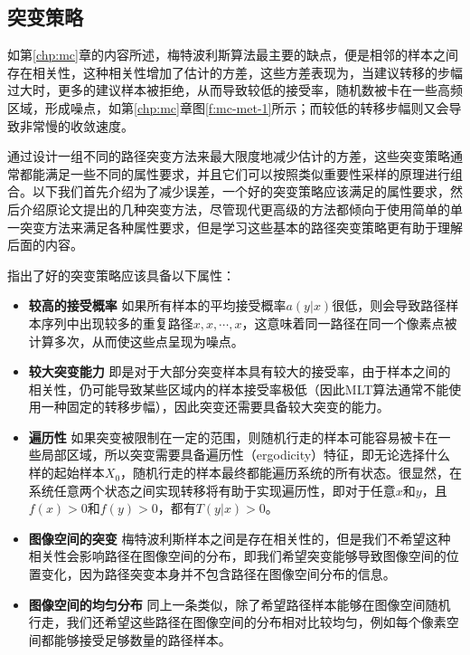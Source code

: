 \subsection{突变策略}\label{sec:mlt-mutations}
如第\ref{chp:mc}章的内容所述，梅特波利斯算法最主要的缺点，便是相邻的样本之间存在相关性，这种相关性增加了估计的方差，这些方差表现为，当建议转移的步幅过大时，更多的建议样本被拒绝，从而导致较低的接受率，随机数被卡在一些高频区域，形成噪点，如第\ref{chp:mc}章图\ref{f:mc-met-1}所示；而较低的转移步幅则又会导致非常慢的收敛速度。

\cite{a:MetropolisLightTransport}通过设计一组不同的路径突变方法来最大限度地减少估计的方差，这些突变策略通常都能满足一些不同的属性要求，并且它们可以按照类似重要性采样的原理进行组合。以下我们首先介绍为了减少误差，一个好的突变策略应该满足的属性要求，然后介绍原论文提出的几种突变方法，尽管现代更高级的方法都倾向于使用简单的单一突变方法来满足各种属性要求，但是学习这些基本的路径突变策略更有助于理解后面的内容。

\cite{a:MetropolisLightTransport}指出了好的突变策略应该具备以下属性：

\begin{itemize}
	\item \textbf{较高的接受概率 }如果所有样本的平均接受概率$a({y}|{x})$很低，则会导致路径样本序列中出现较多的重复路径${x},{x},\cdots,{x}$，这意味着同一路径在同一个像素点被计算多次，从而使这些点呈现为噪点。
	\item \textbf{较大突变能力 }即是对于大部分突变样本具有较大的接受率，由于样本之间的相关性，仍可能导致某些区域内的样本接受率极低（因此MLT算法通常不能使用一种固定的转移步幅），因此突变还需要具备较大突变的能力。
	\item \textbf{遍历性 }如果突变被限制在一定的范围，则随机行走的样本可能容易被卡在一些局部区域，所以突变需要具备遍历性（ergodicity）特征，即无论选择什么样的起始样本${X}_0$，随机行走的样本最终都能遍历系统的所有状态。很显然，在系统任意两个状态之间实现转移将有助于实现遍历性，即对于任意${x}$和${y}$，且$f({x})>0$和$f({y})>0$，都有$T({y}|{x})>0$。
	\item \textbf{图像空间的突变 }梅特波利斯样本之间是存在相关性的，但是我们不希望这种相关性会影响路径在图像空间的分布，即我们希望突变能够导致图像空间的位置变化，因为路径突变本身并不包含路径在图像空间分布的信息。
	\item \textbf{图像空间的均匀分布 }同上一条类似，除了希望路径样本能够在图像空间随机行走，我们还希望这些路径在图像空间的分布相对比较均匀，例如每个像素空间都能够接受足够数量的路径样本。
\end{itemize}

